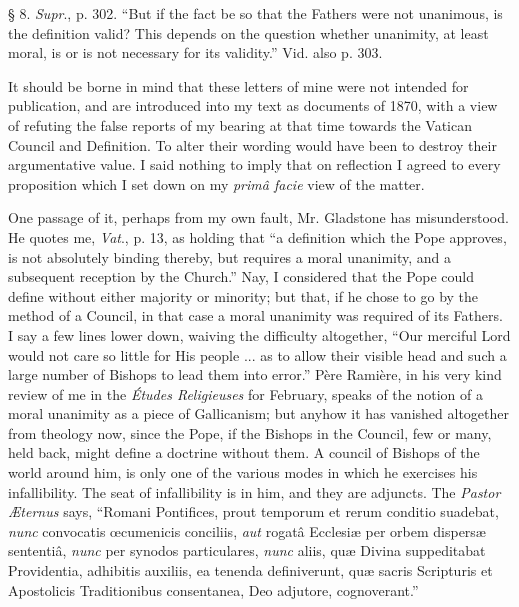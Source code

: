 § 8.
\emph{Supr}., p. 302. ``But if the fact be so that the Fathers were
not unanimous, is the definition valid? This depends on the question
whether unanimity, at least moral, is or is not necessary for its
validity.'' Vid. also p. 303.

It should be borne in mind that these letters of mine were not
intended for publication, and are introduced into my text as documents
of 1870, with a view of refuting the false reports of my bearing at that
time towards the Vatican Council and Definition. To alter their
wording would have been to destroy their argumentative value. I said
nothing to imply that on reflection I agreed to every proposition which
I set down on my \emph{primâ facie} view of the matter.

One passage of it, perhaps from my own fault, Mr. Gladstone has
misunderstood. He quotes me, \emph{Vat}., p. 13, as holding that ``a
definition which the Pope approves, is not absolutely binding thereby,
but requires a moral unanimity, and a subsequent reception by the
Church.'' Nay, I considered that the Pope could define without
either majority or minority; but that, if he chose to go by the method
of a Council, in that case a moral unanimity was required of its
Fathers. I say a few lines lower down, waiving the difficulty
altogether, ``Our merciful Lord would not care so little for His
people ... as to allow their visible head and such a large number of
Bishops to lead them into error.'' Père Ramière, in his very kind
review of me in the \emph{Études Religieuses} for February, speaks of
the notion of a moral unanimity as a piece of Gallicanism; but anyhow it
has vanished altogether from theology now, since the Pope, if the
Bishops in the Council, few or many, held back, might define a doctrine
without them. A council of Bishops of the world around him, is only one
of the various modes in which he exercises his infallibility. The seat
of infallibility is in him, and they are adjuncts. The \emph{Pastor
Æternus} says, ``Romani Pontifices, prout temporum et rerum
conditio suadebat, \emph{nunc} convocatis œcumenicis conciliis, \emph{aut}
rogatâ Ecclesiæ per orbem dispersæ sententiâ, \emph{nunc} per
synodos particulares, \emph{nunc} aliis, quæ Divina suppeditabat
Providentia, adhibitis auxiliis, ea tenenda definiverunt, quæ sacris
Scripturis et Apostolicis Traditionibus consentanea, Deo adjutore,
cognoverant.''


